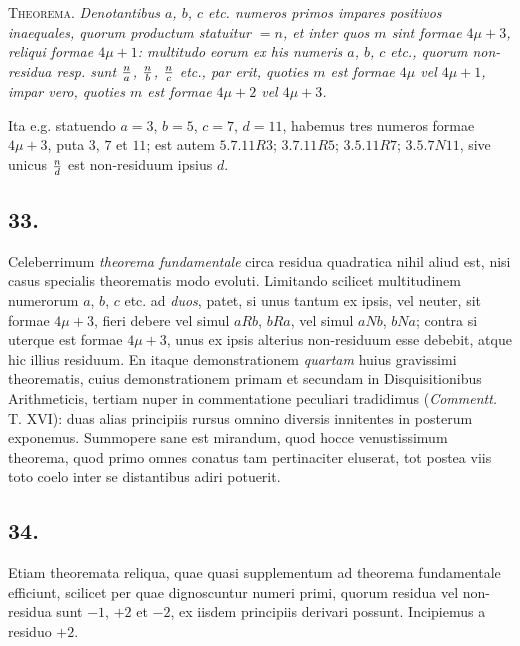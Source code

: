 \documentclass[twoside,12pt]{memoir}
\let\oldfrac\frac
\def\frac#1#2{\mathchoice{\tfrac{#1}{#2}}{\oldfrac{#1}{#2}}{\genfrac{}{}{}{2}{#1}{#2\mathstrut}}{\genfrac{}{}{}{3}{#1}{#2\mathstrut}}}
\begin{document}
\textsc{Theorema.} \textit{Denotantibus \(a\), \(b\), \(c\) etc. numeros primos impares positivos inaequales, quorum productum statuitur \(=n\), et inter quos \(m\) sint formae \(4 \mu+3\), reliqui formae \(4 \mu+1\): multitudo eorum ex his numeris \(a\), \(b\), \(c\) etc., quorum non-residua resp. sunt \(\frac{n}{a}\), \(\frac{n}{b}\), \(\frac{n}{c}\) etc., par erit, quoties \(m\) est formae \(4 \mu\) vel \(4 \mu+1\), impar vero, quoties \(m\) est formae \(4 \mu+2\) vel \(4 \mu+3\).}
 
Ita e.g. statuendo \(a=3\), \(b=5\), \(c=7\), \(d=11\), habemus tres numeros formae \(4 \mu+3\), puta \(3\), \(7\) et \(11\); est autem \(5.7.11R3\); \(3.7.11R5\); \(3.5.11R7\); \(3.5.7N11\), sive unicus \(\frac{n}{d}\) est non-residuum ipsius \(d\).

\subsection*{33.}
 
Celeberrimum \textit{theorema fundamentale} circa residua quadratica nihil aliud est, nisi casus specialis theorematis modo evoluti. Limitando scilicet multitudinem\pagebreak%
numerorum \(a\), \(b\), \(c\)  etc. ad \textit{duos}, patet, si unus tantum ex ipsis, vel neuter, sit formae \(4 \mu+3\), fieri debere vel simul \(a R b\), \(b R a\), vel simul \(a N b\), \(b N a\); contra si uterque est formae \(4 \mu+3\), unus ex ipsis alterius non-residuum esse debebit, atque hic illius residuum. En itaque demonstrationem \textit{quartam} huius gravissimi theorematis, cuius demonstrationem primam et secundam in Disquisitionibus Arithmeticis, tertiam nuper in commentatione peculiari tradidimus (\textit{Commentt.} T. XVI): duas alias principiis rursus omnino diversis innitentes in posterum exponemus. Summopere sane est mirandum, quod hocce venustissimum theorema, quod primo omnes conatus tam pertinaciter eluserat, tot postea viis toto coelo inter se distantibus adiri potuerit.

\subsection*{34.}
 
Etiam theoremata reliqua, quae quasi supplementum ad theorema fundamentale efficiunt, scilicet per quae dignoscuntur numeri primi, quorum residua vel non-residua sunt \(-1\), \(+2\) et \(-2\), ex iisdem principiis derivari possunt. Incipiemus a residuo \(+2\).
\end{document}

